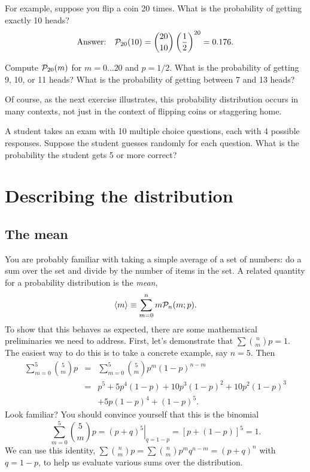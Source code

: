 For example, suppose you flip a coin 20 times.  What is the probability of getting exactly 10 heads?
\[
	\textrm{Answer:}\quad\mathcal{P}_{20}(10) = {20\choose10} \left(\frac{1}{2}\right)^{20} = 0.176.
\]
\begin{exercisebox}
\label{e.prob-distribution}
Compute $\mathcal{P}_{20}(m)$ for $m = 0\ldots20$ and $p= 1/2$.  What is the probability of getting 9, 10, or 11 heads?  What is the probability of getting between 7 and 13 heads?
\end{exercisebox}

Of course, as the next exercise illustrates, this probability distribution occurs in many contexts, not just in the context of flipping coins or staggering home.

\begin{exercisebox}
A student takes an exam with 10 multiple choice questions, each with 4 possible responses.  Suppose the student guesses randomly for each question.  What is the probability the student gets 5 or more correct?
\end{exercisebox}

\section{Describing the distribution}
\subsection{The mean}

You are probably familiar with taking a simple average of a set of numbers: do a sum over the set and divide by the number of items in the set.  A related quantity for a probability distribution is the \emph{mean},
\begin{equation}\label{e.mean}
 \left\langle m\right\rangle \equiv \sum_{m=0}^{n} m\mathcal{P}_{n}(m;p).
\end{equation}
To show that this behaves as expected, there are some mathematical preliminaries we need to address.  First, let's demonstrate that $\sum\binom{n}{m}{p} = 1$.  The easiest way to do this is to take a concrete example, say $n=5$.  Then
\begin{eqnarray*} \sum_{m=0}^{5}\binom{5}{m}{p} &=& \sum_{m=0}^{5}{5\choose m}p^{m}(1-p)^{n-m}\\
	&=&	p^{5}+5p^{4}(1-p)+10p^{3}(1-p)^{2}+10p^{2}(1-p)^{3}\\
	&& +5p(1-p)^{4}+(1-p)^{5}.
\end{eqnarray*}
Look familiar?  You should convince yourself that this is the binomial
\[ \sum_{m=0}^{5}\binom{5}{m}{p} = \left.\left(p+q\right)^{5}\right|_{q=1-p}
	= \left[p + \left(1-p\right)\right]^{5} = 1. \]
We can use this identity, $\sum\binom{n}{m}{p}=\sum{n\choose m}p^{m}q^{n-m} = (p+q)^{n}$ with $q=1-p$, to help us evaluate various sums over the distribution.

